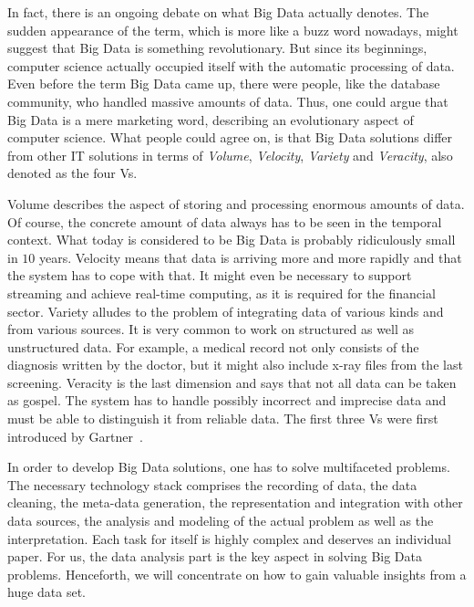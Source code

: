 In fact, there is an ongoing debate on what Big Data actually denotes.
The sudden appearance of the term, which is more like a buzz word nowadays, might suggest that Big Data is something revolutionary.
But since its beginnings, computer science actually occupied itself with the automatic processing of data.
Even before the term Big Data came up, there were people, like the database community, who handled massive amounts of data.
Thus, one could argue that Big Data is a mere marketing word, describing an evolutionary aspect of computer science.
What people could agree on, is that Big Data solutions differ from other IT solutions in terms of \emph{Volume}, \emph{Velocity}, \emph{Variety} and \emph{Veracity}, also denoted as the four Vs.

Volume describes the aspect of storing and processing enormous amounts of data.
Of course, the concrete amount of data always has to be seen in the temporal context.
What today is considered to be Big Data is probably ridiculously small in $10$ years.
Velocity means that data is arriving more and more rapidly and that the system has to cope with that.
It might even be necessary to support streaming and achieve real-time computing, as it is required for the financial sector.
Variety alludes to the problem of integrating data of various kinds and from various sources.
It is very common to work on structured as well as unstructured data.
For example, a medical record not only consists of the diagnosis written by the doctor, but it might also include x-ray files from the last screening.
Veracity is the last dimension and says that not all data can be taken as gospel.
The system has to handle possibly incorrect and imprecise data and must be able to distinguish it from reliable data.
The first three Vs were first introduced by Gartner~\cite{gartner}.

In order to develop Big Data solutions, one has to solve multifaceted problems.
The necessary technology stack comprises the recording of data, the data cleaning, the meta-data generation, the representation and integration with other data sources, the analysis and modeling of the actual problem as well as the interpretation.
Each task for itself is highly complex and deserves an individual paper.
For us, the data analysis part is the key aspect in solving Big Data problems.
Henceforth, we will concentrate on how to gain valuable insights from a huge data set.

